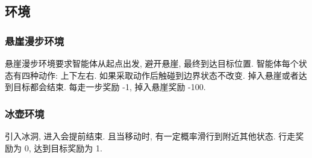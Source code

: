 \subsection{环境}

\subsubsection{悬崖漫步环境}
悬崖漫步环境要求智能体从起点出发, 避开悬崖, 最终到达目标位置. 智能体每个状态有四种动作: 上下左右. 如果采取动作后触碰到边界状态不改变. 掉入悬崖或者达到目标都会结束. 每走一步奖励 -1, 掉入悬崖奖励 -100.


\subsubsection{冰壶环境}
引入冰洞, 进入会提前结束. 且当移动时, 有一定概率滑行到附近其他状态. 行走奖励为 0, 达到目标奖励为 1.




